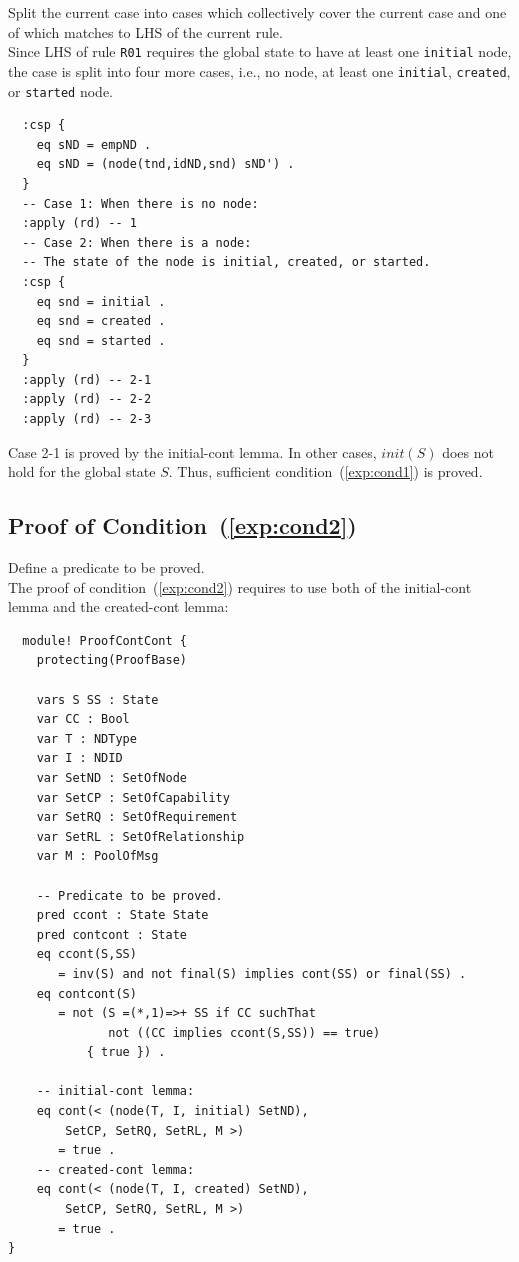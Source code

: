 \documentclass[12pt]{report}
\begin{document}
 Split the current case into cases which
collectively cover the current case and one of which matches to LHS of
the current rule. \\
Since LHS of rule {\tt R01} requires the global state to have at least
one {\tt initial} node, the case is split into four more cases, i.e., no
node, at least one {\tt initial}, {\tt created}, or {\tt started}
node.
\small
\begin{verbatim}
  :csp { 
    eq sND = empND .
    eq sND = (node(tnd,idND,snd) sND') .
  }
  -- Case 1: When there is no node:
  :apply (rd) -- 1
  -- Case 2: When there is a node:
  -- The state of the node is initial, created, or started.
  :csp { 
    eq snd = initial .
    eq snd = created .
    eq snd = started .
  }
  :apply (rd) -- 2-1
  :apply (rd) -- 2-2
  :apply (rd) -- 2-3
\end{verbatim}
\normalsize
Case 2-1 is proved by the initial-cont lemma. In other cases,
$init(S)$ does not hold for the global state $S$. Thus, sufficient
condition~(\ref{exp:cond1}) is proved.

\subsection{Proof of Condition~(\ref{exp:cond2})}
\label{sec:TOSCAcontcont}
 Define a predicate to be proved. \\ 
The proof of condition~(\ref{exp:cond2}) requires to use both of the
initial-cont lemma and the created-cont lemma:
\small
\begin{verbatim}
  module! ProofContCont {
    protecting(ProofBase)
  
    vars S SS : State
    var CC : Bool
    var T : NDType
    var I : NDID
    var SetND : SetOfNode
    var SetCP : SetOfCapability
    var SetRQ : SetOfRequirement
    var SetRL : SetOfRelationship
    var M : PoolOfMsg
  
    -- Predicate to be proved.
    pred ccont : State State
    pred contcont : State
    eq ccont(S,SS)
       = inv(S) and not final(S) implies cont(SS) or final(SS) .
    eq contcont(S)
       = not (S =(*,1)=>+ SS if CC suchThat
              not ((CC implies ccont(S,SS)) == true)
           { true }) .
  
    -- initial-cont lemma: 
    eq cont(< (node(T, I, initial) SetND), 
  	    SetCP, SetRQ, SetRL, M >)
       = true .
    -- created-cont lemma:
    eq cont(< (node(T, I, created) SetND), 
  	    SetCP, SetRQ, SetRL, M >)
       = true .
}
\end{verbatim}
\normalsize
\end{document}
